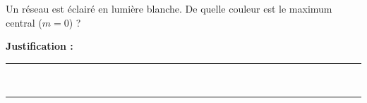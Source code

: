 Un réseau est éclairé en lumière blanche. De quelle couleur est le maximum central ($m = 0$) ?

\choices

\noindent\textbf{Justification :} \hrulefill \\[2.5ex]
\rule{\linewidth}{0.4pt} \\[2.5ex]
\rule{\linewidth}{0.4pt}
\vfill
